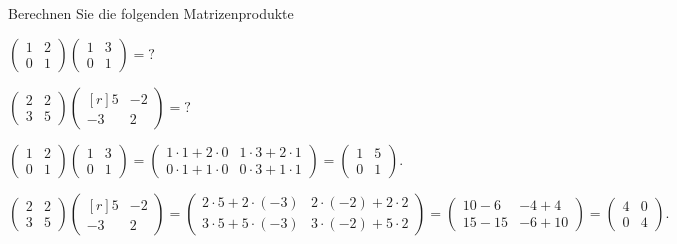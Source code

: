 Berechnen Sie die folgenden Matrizenprodukte
\begin{teilaufgaben}
\item
$
\begin{pmatrix} 1 & 2 \\ 0 & 1 \end{pmatrix}
\begin{pmatrix} 1 & 3 \\ 0 & 1 \end{pmatrix}
=
\text{?}
$
\item
$
\begin{pmatrix}     2 &  2 \\  3 & 5 \end{pmatrix}
\begin{pmatrix*}[r] 5 & -2 \\ -3 & 2 \end{pmatrix*}
=
\text{?}
$
\end{teilaufgaben}

\begin{loesung}
\begin{teilaufgaben}
\item
$
\begin{pmatrix} 1 & 2 \\ 0 & 1 \end{pmatrix}
\begin{pmatrix} 1 & 3 \\ 0 & 1 \end{pmatrix}
=
\begin{pmatrix}
1 \cdot 1 + 2 \cdot 0 & 1 \cdot 3 + 2 \cdot 1 \\
0 \cdot 1 + 1 \cdot 0 & 0 \cdot 3 + 1 \cdot 1
\end{pmatrix}
=
\begin{pmatrix}
1 & 5 \\
0 & 1
\end{pmatrix}.
$
\item
$
\begin{pmatrix}     2 &  2 \\  3 & 5 \end{pmatrix}
\begin{pmatrix*}[r] 5 & -2 \\ -3 & 2 \end{pmatrix*}
=
\begin{pmatrix}
2 \cdot 5 + 2 \cdot (-3) &  2 \cdot (-2) + 2 \cdot 2 \\
3 \cdot 5 + 5 \cdot (-3) &  3 \cdot (-2) + 5 \cdot 2
\end{pmatrix}
=
\begin{pmatrix}
10-6 & -4+4 \\
15-15& -6+10
\end{pmatrix}
=
\begin{pmatrix}
4 & 0 \\
0 & 4
\end{pmatrix}.
$
\qedhere
\end{teilaufgaben}
\end{loesung}
